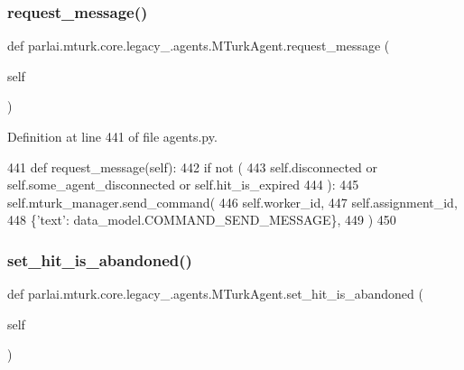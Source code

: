 \subsubsection{\texorpdfstring{request\+\_\+message()}{request\_message()}}
{\footnotesize\ttfamily def parlai.\+mturk.\+core.\+legacy\+\_.\+agents.\+M\+Turk\+Agent.\+request\+\_\+message (\begin{DoxyParamCaption}\item[{}]{self }\end{DoxyParamCaption})}



Definition at line 441 of file agents.\+py.


\begin{DoxyCode}
441     \textcolor{keyword}{def }request\_message(self):
442         \textcolor{keywordflow}{if} \textcolor{keywordflow}{not} (
443             self.disconnected \textcolor{keywordflow}{or} self.some\_agent\_disconnected \textcolor{keywordflow}{or} self.hit\_is\_expired
444         ):
445             self.mturk\_manager.send\_command(
446                 self.worker\_id,
447                 self.assignment\_id,
448                 \{\textcolor{stringliteral}{'text'}: data\_model.COMMAND\_SEND\_MESSAGE\},
449             )
450 
\end{DoxyCode}
\mbox{\label{classparlai_1_1mturk_1_1core_1_1legacy__2018_1_1agents_1_1MTurkAgent_a748e50850e239f14236d4817e20fa799}} 
\subsubsection{\texorpdfstring{set\+\_\+hit\+\_\+is\+\_\+abandoned()}{set\_hit\_is\_abandoned()}}
{\footnotesize\ttfamily def parlai.\+mturk.\+core.\+legacy\+\_.\+agents.\+M\+Turk\+Agent.\+set\+\_\+hit\+\_\+is\+\_\+abandoned (\begin{DoxyParamCaption}\item[{}]{self }\end{DoxyParamCaption})}

